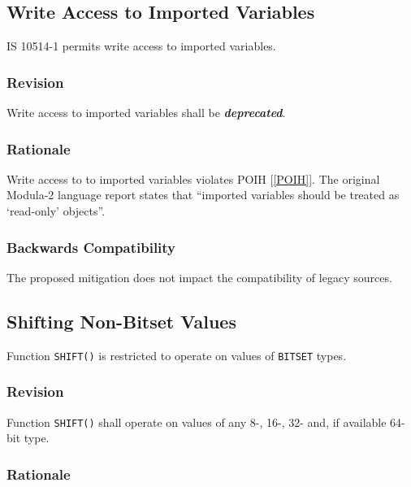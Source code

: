 \documentclass[10pt,a4paper,leqno,fleqn]{article}
\renewcommand{\emph}[1]{\textbf{\textit{#1}}}
\begin{document}
\subsection{Write Access to Imported Variables}

IS 10514-1 permits write access to imported variables.

\subsubsection{Revision}

Write access to imported variables shall be \emph{deprecated}. 

\subsubsection{Rationale}

Write access to to imported variables violates POIH [\ref{POIH}]. The
original Modula-2 language report \cite[p.88]{Wirth88} states that
``imported variables should be treated as `read-only' objects''.

\subsubsection{Backwards Compatibility}

The proposed mitigation does not impact the compatibility of legacy sources.


\subsection{Shifting Non-Bitset Values}

Function \verb|SHIFT()| is restricted to operate on values of \verb|BITSET| types.

\subsubsection{Revision}

Function \verb|SHIFT()| shall operate on values of any 8-, 16-, 32-
and, if available 64-bit type.

\subsubsection{Rationale}
\end{document}
